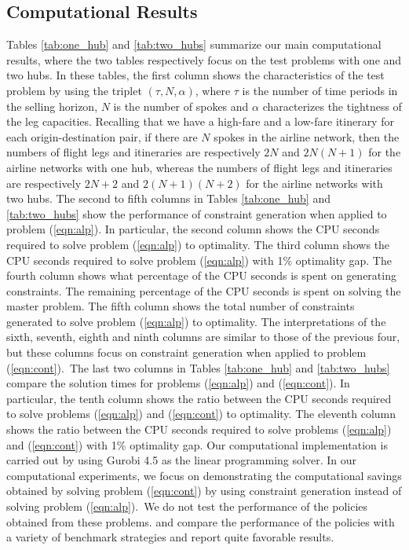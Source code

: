 \subsection{Computational Results}

Tables \ref{tab:one_hub} and \ref{tab:two_hubs} summarize our main computational results, where the two tables respectively focus on the test problems with one and two hubs. In these tables, the first column shows the characteristics of the test problem by using the triplet $(\tau,N,\alpha)$, where $\tau$ is the number of time periods in the selling horizon, $N$ is the number of spokes and $\alpha$ characterizes the tightness of the leg capacities. Recalling that we have a high-fare and a low-fare itinerary for each origin-destination pair, if there are $N$ spokes in the airline network, then the numbers of flight legs and itineraries are respectively $2N$ and $2N(N+1)$ for the airline networks with one hub, whereas the numbers of flight legs and itineraries are respectively $2N+2$ and $2(N+1)(N+2)$ for the airline networks with two hubs. The second to fifth columns in Tables \ref{tab:one_hub} and \ref{tab:two_hubs} show the performance of constraint generation when applied to problem (\ref{eqn:alp}). In particular, the second column shows the CPU seconds required to solve problem (\ref{eqn:alp}) to optimality. The third column shows the CPU seconds required to solve problem (\ref{eqn:alp}) with 1\% optimality gap. The fourth column shows what percentage of the CPU seconds is spent on generating constraints. The remaining percentage of the CPU seconds is spent on solving the master problem. The fifth column shows the total number of constraints generated to solve problem (\ref{eqn:alp}) to optimality. The interpretations of the sixth, seventh, eighth and ninth columns are similar to those of the previous four, but these columns focus on constraint generation when applied to problem \mbox{(\ref{eqn:cont})}.~The last two columns in Tables \ref{tab:one_hub} and \ref{tab:two_hubs} compare the solution times for problems \mbox{(\ref{eqn:alp})} and (\ref{eqn:cont}). In particular, the tenth column shows the ratio between the CPU seconds required to solve problems \mbox{(\ref{eqn:alp})} and (\ref{eqn:cont}) to optimality. The eleventh column shows the ratio between the CPU seconds required to solve problems \mbox{(\ref{eqn:alp})} and (\ref{eqn:cont}) with 1\% optimality gap. Our computational implementation is carried out by using Gurobi 4.5 as the linear programming solver. In our computational experiments, we focus on demonstrating the computational savings obtained by solving problem (\ref{eqn:cont}) by using constraint generation instead of solving problem (\ref{eqn:alp}).~We do not test the performance of the policies obtained from these problems.  and  compare the performance of the policies with a variety of benchmark strategies and report quite favorable results.



